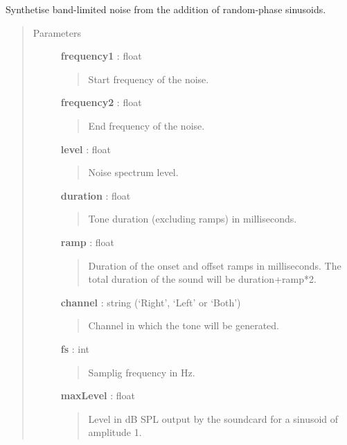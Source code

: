 \documentclass[a4paper,12pt,english]{sphinxmanual}
\begin{document}
\begin{fulllineitems}
\label{sndlib:sndlib.steepNoise}
Synthetise band-limited noise from the addition of random-phase
sinusoids.
\begin{quote}\begin{description}
\item[{Parameters }] \leavevmode
\textbf{frequency1} : float
\begin{quote}

Start frequency of the noise.
\end{quote}

\textbf{frequency2} : float
\begin{quote}

End frequency of the noise.
\end{quote}

\textbf{level} : float
\begin{quote}

Noise spectrum level.
\end{quote}

\textbf{duration} : float
\begin{quote}

Tone duration (excluding ramps) in milliseconds.
\end{quote}

\textbf{ramp} : float
\begin{quote}

Duration of the onset and offset ramps in milliseconds.
The total duration of the sound will be duration+ramp*2.
\end{quote}

\textbf{channel} : string (`Right', `Left' or `Both')
\begin{quote}

Channel in which the tone will be generated.
\end{quote}

\textbf{fs} : int
\begin{quote}

Samplig frequency in Hz.
\end{quote}

\textbf{maxLevel} : float
\begin{quote}

Level in dB SPL output by the soundcard for a sinusoid of amplitude 1.
\end{quote}


\end{description}
\end{quote}
\end{fulllineitems}
\end{document}
